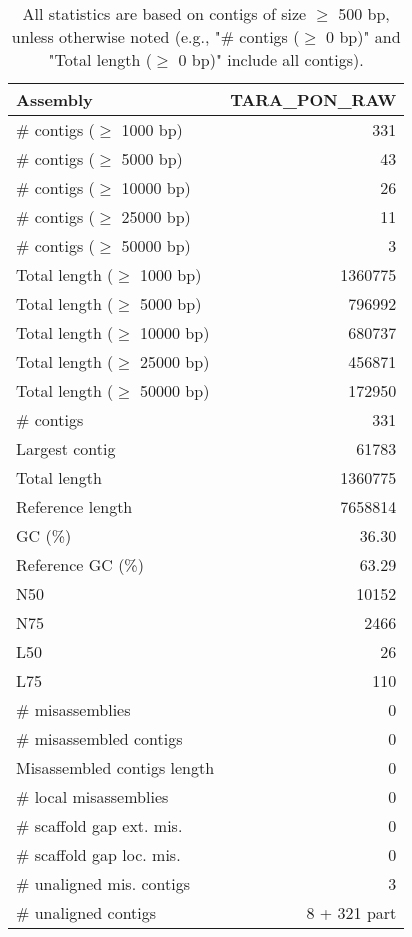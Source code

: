 \documentclass[12pt,a4paper]{article}
\begin{document}
\begin{table}[ht]
\begin{center}
\caption{All statistics are based on contigs of size $\geq$ 500 bp, unless otherwise noted (e.g., "\# contigs ($\geq$ 0 bp)" and "Total length ($\geq$ 0 bp)" include all contigs).}
\begin{tabular}{|l*{1}{|r}|}
\hline
Assembly & TARA\_PON\_RAW \\ \hline
\# contigs ($\geq$ 1000 bp) & 331 \\ \hline
\# contigs ($\geq$ 5000 bp) & 43 \\ \hline
\# contigs ($\geq$ 10000 bp) & 26 \\ \hline
\# contigs ($\geq$ 25000 bp) & 11 \\ \hline
\# contigs ($\geq$ 50000 bp) & 3 \\ \hline
Total length ($\geq$ 1000 bp) & 1360775 \\ \hline
Total length ($\geq$ 5000 bp) & 796992 \\ \hline
Total length ($\geq$ 10000 bp) & 680737 \\ \hline
Total length ($\geq$ 25000 bp) & 456871 \\ \hline
Total length ($\geq$ 50000 bp) & 172950 \\ \hline
\# contigs & 331 \\ \hline
Largest contig & 61783 \\ \hline
Total length & 1360775 \\ \hline
Reference length & 7658814 \\ \hline
GC (\%) & 36.30 \\ \hline
Reference GC (\%) & 63.29 \\ \hline
N50 & 10152 \\ \hline
N75 & 2466 \\ \hline
L50 & 26 \\ \hline
L75 & 110 \\ \hline
\# misassemblies & 0 \\ \hline
\# misassembled contigs & 0 \\ \hline
Misassembled contigs length & 0 \\ \hline
\# local misassemblies & 0 \\ \hline
\# scaffold gap ext. mis. & 0 \\ \hline
\# scaffold gap loc. mis. & 0 \\ \hline
\# unaligned mis. contigs & 3 \\ \hline
\# unaligned contigs & 8 + 321 part \\ \hline

\end{tabular}
\end{center}
\end{table}
\end{document}
